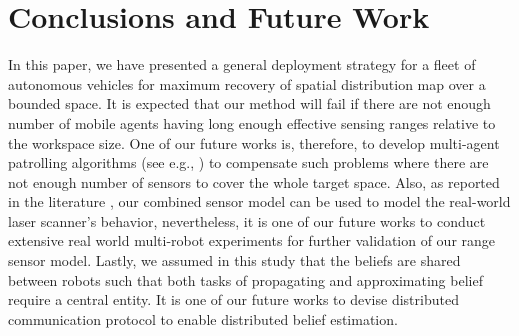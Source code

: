 \documentclass[journal]{IEEEtran}
\begin{document}
\section{Conclusions and Future Work}
\label{sec:sec9}
In this paper, we have presented a general deployment strategy for a fleet of autonomous vehicles for maximum recovery of spatial distribution map over a bounded space. It is expected that our method will fail if there are not enough number of mobile agents having long enough effective sensing ranges relative to the workspace size. One of our future works is, therefore, to develop multi-agent patrolling algorithms (see e.g., \cite{portugal2011survey}) to compensate such problems where there are not enough number of sensors to cover the whole target space.
Also, as reported in the literature \cite{anguelov2004detecting}, our combined sensor model can be used to model the real-world laser scanner's behavior, nevertheless, it is one of our future works to conduct extensive real world multi-robot experiments for further validation of our range sensor model.
Lastly, we assumed in this study that the beliefs are shared between robots such that both tasks of propagating and approximating belief require a central entity. It is one of our future works to devise distributed communication protocol to enable distributed belief estimation. 




\end{document}

